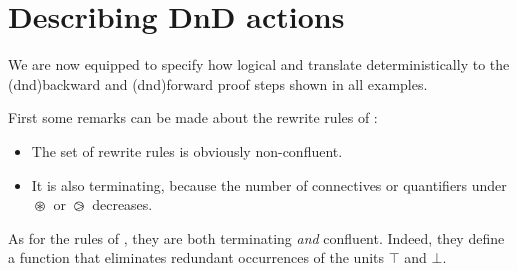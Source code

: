 \section{Describing DnD actions}

We are now equipped to specify how logical and  translate
deterministically to the \kl(dnd){backward} and \kl(dnd){forward} proof steps shown in all examples.

First some remarks can be made about the rewrite rules of :
\begin{itemize}
\item The set of rewrite rules is obviously non-confluent. 
\item It is also terminating, because the number of connectives or quantifiers
  under $\operatorname{\,\varoast\,}$ or $\operatorname{\,\varogreaterthan\,}$ decreases.
\end{itemize}

As for the rules of , they are both terminating \emph{and}
confluent. Indeed, they define a function that eliminates redundant occurrences
of the units $\top$ and $\bot$.

